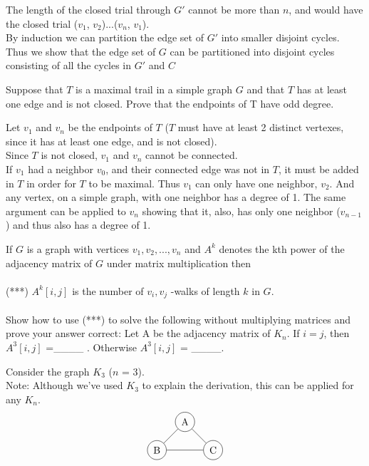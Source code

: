 \documentclass[12pt]{article}
\newenvironment{question}[2][Question]{\begin{trivlist}
\item[\hskip \labelsep {\bfseries #1}\hskip \labelsep {\bfseries #2.}]}{\end{trivlist}}
\begin{document}
The length of the closed trial through $G'$ cannot be more than $n$, and would have the closed trial ($v_1$, $v_2$)...($v_n$, $v_1$). \\

By induction we can partition the edge set of $G'$ into smaller disjoint cycles. Thus we show that the edge set of $G$ can be partitioned into disjoint cycles consisting of all the cycles in $G'$ and $C$\\


\begin{question}{4}
Suppose that $T$ is a maximal trail in a simple graph $G$ and that $T$ has at least one edge and is not closed. Prove that the endpoints of T have odd degree.
\end{question}

Let $v_1$ and $v_n$ be the endpoints of $T$ ($T$ must have at least 2 distinct vertexes, since it has at least one edge, and is not closed). \\

Since $T$ is not closed, $v_1$ and $v_n$ cannot be connected. \\

If $v_1$ had a neighbor $v_0$, and their connected edge was not in $T$, it must be added in $T$ in order for $T$ to be maximal. Thus $v_1$ can only have one neighbor, $v_2$. And any vertex, on a simple graph, with one neighbor has a degree of 1. The same argument can be applied to $v_n$ showing that it, also, has only one neighbor ($v_{n-1}$) and thus also has a degree of 1. \\

\begin{question}{5}
If $G$ is a graph with vertices $v_1, v_2, . . . , v_n$ and $A^k$ denotes the kth power of the adjacency matrix
of $G$ under matrix multiplication then \\ \\

(***) $A^{k}[i, j]$ is the number of $v_i, v_j$ -walks of length $k$ in $G$. \\ \\

Show how to use (***) to solve the following without multiplying matrices and prove your answer
correct: Let A be the adjacency matrix of $K_n$. If $i = j$, then $A^3[i, j]$ =\_\_\_\_ . Otherwise
$A^{3}[i, j]$ = \_\_\_\_.
\end{question}

Consider the graph $K_3$ ($n$ = 3).\\
Note: Although we've used $K_3$ to explain the derivation, this can be applied for any $K_n$.
\begin{align*}
\begin{tikzpicture}
\node[shape=circle,draw=black] (A) at (1,1) {A};
\node[shape=circle,draw=black] (B) at (0,0) {B};
\node[shape=circle,draw=black] (C) at (2,0) {C};
\path [] (A) edge node[left] {} (B);
\path [] (A) edge node[left] {} (C);
\path [] (B) edge node[left] {} (C);
\end{tikzpicture}
\end{align*}
\end{document}
